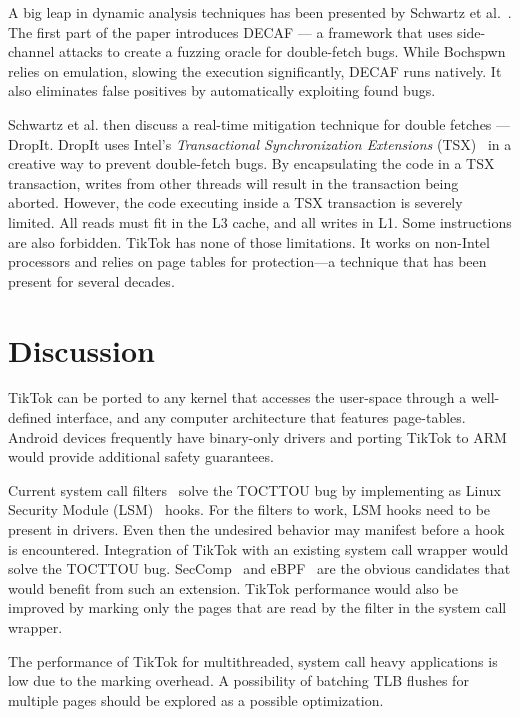 \documentclass[conference]{IEEEtran}
\newcommand{\sysname}{TikTok}
\begin{document}
A big leap in dynamic analysis techniques has been presented by Schwartz et
al.~\cite{schwarz2018automated}. The first part of the paper introduces DECAF
--- a framework that uses side-channel attacks to create a fuzzing oracle for
double-fetch bugs. While Bochspwn relies on emulation, slowing the execution
significantly, DECAF runs natively. It also eliminates false positives by
automatically exploiting found bugs.

Schwartz et al. then discuss a real-time mitigation technique for double fetches
--- DropIt. DropIt uses Intel's \emph{Transactional Synchronization Extensions}
(TSX)~\cite{intel64and} in a creative way to prevent double-fetch bugs. By
encapsulating the code in a TSX transaction, writes from other threads will
result in the transaction being aborted. However, the code executing inside a
TSX transaction is severely limited. All reads must fit in the L3 cache, and all
writes in L1. Some instructions are also forbidden. \sysname{} has none of those
limitations. It works on non-Intel processors and relies on page tables for
protection---a technique that has been present for several decades.

\section{Discussion}
\label{sec:discussion}
\sysname{} can be ported to any kernel that accesses the user-space through a
well-defined interface, and any computer architecture that features page-tables.
Android devices frequently have binary-only drivers and porting \sysname{} to 
ARM would provide additional safety guarantees.

Current system call filters~\cite{landlock,krsi} solve the TOCTTOU bug by
implementing as Linux Security Module (LSM)~\cite{morris2002linux} hooks. For
the filters to work, LSM hooks need to be present in drivers. Even then the
undesired behavior may manifest before a hook is encountered. Integration of
\sysname{} with an existing system call wrapper would solve the TOCTTOU bug.
SecComp~\cite{seccomp} and eBPF~\cite{ebpf} are the obvious candidates that
would benefit from such an extension. \sysname{} performance would also be
improved by marking only the pages that are read by the filter in the system
call wrapper.

The performance of \sysname{} for multithreaded, system call heavy applications
is low due to the marking overhead. A possibility of batching TLB
flushes for multiple pages should be explored as a possible optimization.
\end{document}
